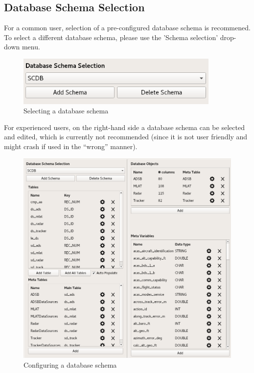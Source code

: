 \documentclass[10pt,letterpaper,extrafontsizes]{memoir}
\begin{document}
\subsection{Database Schema Selection}
For a common user, selection of a pre-configured database schema is recommened. To select a different database schema, please use the 'Schema selection' drop-down menu.\\

\begin{figure}[H]
  \center
    \includegraphics[width=10cm]{../screenshots/database_schema_selection.png}
  \caption{Selecting a database schema}
  \label{fig:db_schema_select}
\end{figure}

For experienced users, on the right-hand side a database schema can be selected and edited, which is currently not recommended (since it is not user friendly and might crash if used in the ``wrong'' manner).

\begin{figure}[H]
  \hspace*{-1cm}
    \includegraphics[width=16cm]{../screenshots/database_schema_configuration.png}
  \caption{Configuring a database schema}
  \label{fig:db_schema_configuration}
\end{figure}
\end{document}
